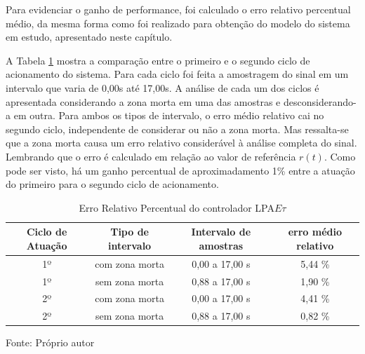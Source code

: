 Para evidenciar o ganho de performance, 
foi calculado o erro relativo percentual médio,
da mesma forma como foi realizado para obtenção do modelo
do sistema em estudo, 
apresentado neste capítulo.

A Tabela \ref{tab:ErroLPAEt} mostra
a comparação entre o primeiro e o segundo ciclo de acionamento do
sistema. Para cada ciclo foi feita a amostragem do sinal em um
intervalo que varia de 0,00s até 17,00s. A análise de cada um dos ciclos é
apresentada considerando a zona morta em uma das amostras e
desconsiderando-a em outra. Para ambos os tipos de intervalo, o erro médio
relativo cai no segundo ciclo, independente de considerar ou não a
zona morta. Mas ressalta-se que a zona morta causa um erro relativo
considerável à análise completa do sinal. Lembrando que o erro é
calculado em relação ao valor de referência $r(t)$. 
Como pode ser visto, há um ganho percentual de 
aproximadamento 1\% entre a atuação do primeiro 
para o segundo ciclo de acionamento. 



\begin{table}[h]%
\centering
\caption{Erro Relativo Percentual do controlador LPA$E\tau$}
\label{tab:ErroLPAEt}

\begin{tabular}{c|c|c|c}
\hline
Ciclo de Atuação & Tipo de intervalo & Intervalo de amostras  &  erro médio relativo \\ \hline
\hline
1º & com zona morta & 0,00 a 17,00 s &  5,44 \% \\ \hline
1º & sem zona morta & 0,88 a 17,00 s &  1,90 \% \\ \hline
2º & com zona morta & 0,00 a 17,00 s &  4,41 \% \\ \hline
2º & sem zona morta & 0,88 a 17,00 s &  0,82 \% \\ \hline
\end{tabular}

{\vspace{0.2cm} \small Fonte: Próprio autor}
\end{table}



